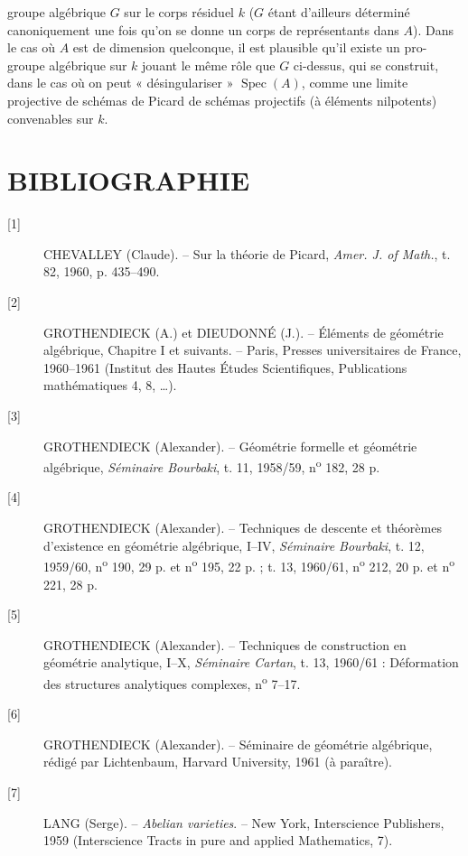 groupe algébrique $G$ sur le corps résiduel $k$ ($G$ étant d'ailleurs
déterminé canoniquement une fois qu'on se donne un corps de représentants dans
$A$). Dans le cas où $A$ est de dimension quelconque, il est plausible qu'il
existe un pro-groupe algébrique sur $k$ jouant le même rôle que $G$ ci-dessus,
qui se construit, dans le cas où on peut « désingulariser »
$\operatorname{Spec}(A)$, comme une limite projective de schémas de Picard de
schémas projectifs (à éléments nilpotents) convenables sur $k$.

\section*{BIBLIOGRAPHIE}

\begin{description}
\item[{[1]}] CHEVALLEY (Claude). -- Sur la théorie de Picard,
\emph{Amer. J. of Math.}, t. 82, 1960, p. 435--490.

\item[{[2]}] GROTHENDIECK (A.) et DIEUDONNÉ (J.). -- Éléments de géométrie
algébrique, Chapitre I et suivants. -- Paris, Presses universitaires de France,
1960--1961 (Institut des Hautes Études Scientifiques, Publications
mathématiques 4, 8, \ldots).

\item[{[3]}] GROTHENDIECK (Alexander). -- Géométrie formelle et géométrie
algébrique, \emph{Séminaire Bourbaki}, t. 11, 1958/59,
n\textsuperscript{o} 182, 28 p.

\item[{[4]}] GROTHENDIECK (Alexander). -- Techniques de descente et théorèmes
d'existence en géométrie algébrique, I--IV, \emph{Séminaire Bourbaki}, t. 12,
1959/60, n\textsuperscript{o} 190, 29 p. et n\textsuperscript{o} 195, 22 p. ;
t. 13, 1960/61, n\textsuperscript{o} 212, 20 p. et
n\textsuperscript{o} 221, 28 p.

\item[{[5]}] GROTHENDIECK (Alexander). -- Techniques de construction en
géométrie analytique, I--X, \emph{Séminaire Cartan}, t. 13, 1960/61 :
Déformation des structures analytiques complexes, n\textsuperscript{o} 7--17.

\item[{[6]}] GROTHENDIECK (Alexander). -- Séminaire de géométrie algébrique,
rédigé par Lichtenbaum, Harvard University, 1961 (à paraître).

\item[{[7]}] LANG (Serge). -- \emph{Abelian varieties}. -- New York,
Interscience Publishers, 1959 (Interscience Tracts in pure and applied
Mathematics, 7).


\end{description}
